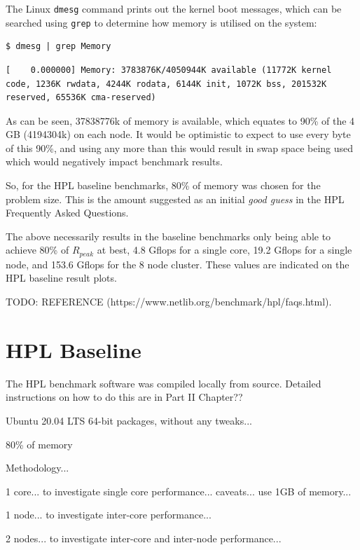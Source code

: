 \documentclass{report}
\begin{document}
The Linux \verb|dmesg| command prints out the kernel boot messages, which can be searched using \verb|grep| to determine how memory is utilised on the system:

\lstset{style=type}
\begin{lstlisting}
$ dmesg | grep Memory
\end{lstlisting}

\lstset{style=type}
\begin{lstlisting}
[    0.000000] Memory: 3783876K/4050944K available (11772K kernel code, 1236K rwdata, 4244K rodata, 6144K init, 1072K bss, 201532K reserved, 65536K cma-reserved)
\end{lstlisting}

As can be seen, 37838776k of memory is available, which equates to 90\% of the 4 GB (4194304k) on each node. It would be optimistic to expect to use every byte of this 90\%, and using any more than this would result in swap space being used which would negatively impact benchmark results.

So, for the HPL baseline benchmarks, 80\% of memory was chosen for the problem size. This is the amount suggested as an initial \emph{good guess} in the HPL Frequently Asked Questions.

The above necessarily results in the baseline benchmarks only being able to achieve 80\% of $R_{peak}$ at best, 4.8 Gflops for a single core, 19.2 Gflops for a single node, and 153.6 Gflops for the 8 node cluster. These values are indicated on the HPL baseline result plots.

TODO: REFERENCE (https://www.netlib.org/benchmark/hpl/faqs.html).


%
%
\section{HPL Baseline}

The HPL benchmark software was compiled locally from source. Detailed instructions on how to do this are in Part II Chapter??

Ubuntu 20.04 LTS 64-bit packages, without any tweaks...

80\% of memory

Methodology...

1 core... to investigate single core performance... caveats... use 1GB of memory...

1 node... to investigate inter-core performance...

2 nodes... to investigate inter-core and inter-node performance...
\end{document}
